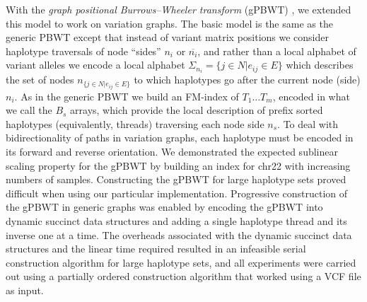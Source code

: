 With the \emph{graph positional Burrows–Wheeler transform} (gPBWT) \cite{Novak2016gPBWT}, we extended this model to work on variation graphs.
The basic model is the same as the generic PBWT except that instead of variant matrix positions we consider haplotype traversals of node ``sides'' $n_i$ or $\overline{n_i}$, and rather than a local alphabet of variant alleles we encode a local alphabet $\Sigma_{n_i} = \{ j \in N | e_{ij} \in E \}$ which describes the set of nodes $n_{\{j \in N | e_{ij} \in E \}}$ to which haplotypes go after the current node (side) $n_i$.
As in the generic PBWT we build an FM-index of $T_1 \ldots T_m$, encoded in what we call the $B_s$ arrays, which provide the local description of prefix sorted haplotypes (equivalently, threads) traversing each node side $n_s$.
To deal with bidirectionality of paths in variation graphs, each haplotype must be encoded in its forward and reverse orientation.
We demonstrated the expected sublinear scaling property for the gPBWT by building an index for chr22 with increasing numbers of samples.
Constructing the gPBWT for large haplotype sets proved difficult when using our particular implementation.
Progressive construction of the gPBWT in generic graphs was enabled by encoding the gPBWT into dynamic succinct data structures and adding a single haplotype thread and its inverse one at a time.
The overheads associated with the dynamic succinct data structures and the linear time required resulted in an infeasible serial construction algorithm for large haplotype sets, and all experiments were carried out using a partially ordered construction algorithm that worked using a VCF file as input.

